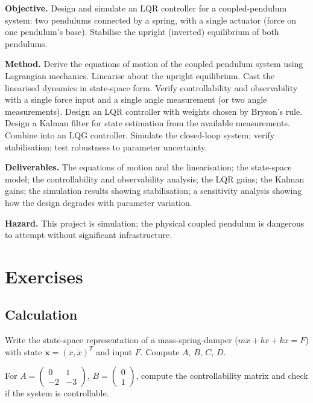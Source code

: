 \begin{project}
\textbf{Objective.} Design and simulate an LQR controller for a coupled-pendulum system: two pendulums connected by a spring, with a single actuator (force on one pendulum's base). Stabilise the upright (inverted) equilibrium of both pendulums.

\textbf{Method.} Derive the equations of motion of the coupled pendulum system using Lagrangian mechanics. Linearise about the upright equilibrium. Cast the linearised dynamics in state-space form. Verify controllability and observability with a single force input and a single angle measurement (or two angle measurements). Design an LQR controller with weights chosen by Bryson's rule. Design a Kalman filter for state estimation from the available measurements. Combine into an LQG controller. Simulate the closed-loop system; verify stabilisation; test robustness to parameter uncertainty.

\textbf{Deliverables.} The equations of motion and the linearisation; the state-space model; the controllability and observability analysis; the LQR gains; the Kalman gains; the simulation results showing stabilisation; a sensitivity analysis showing how the design degrades with parameter variation.

\textbf{Hazard.} This project is simulation; the physical coupled pendulum is dangerous to attempt without significant infrastructure.
\end{project}

\section{Exercises}

\subsection*{Calculation}

\begin{exercise}
Write the state-space representation of a mass-spring-damper ($m\ddot{x} + b\dot{x} + kx = F$) with state $\mathbf{x} = (x, \dot{x})^T$ and input $F$. Compute $A$, $B$, $C$, $D$.
\end{exercise}

\begin{exercise}
For $A = \begin{pmatrix} 0 & 1 \\ -2 & -3 \end{pmatrix}$, $B = \begin{pmatrix} 0 \\ 1 \end{pmatrix}$, compute the controllability matrix and check if the system is controllable.
\end{exercise}

